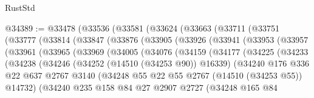 \begin{lexlean}{RustStd}
\begin{coremodule}
@34389 := @33478
    (@33536
      (@33581
        (@33624
          (@33663
            (@33711
              (@33751
                (@33777
                  (@33814
                    (@33847
                      (@33876
                        (@33905
                          (@33926
                            (@33941
                              (@33953
                                (@33957
                                  (@33961
                                    (@33965
                                      (@33969
                                        (@34005
                                          (@34076
                                            (@34159
                                              (@34177
                                                (@34225
                                                  (@34233
                                                    (@34238
                                                      (@34246
                                                        (@34252 (@14510 (@34253 @90)) @16339)
                                                        (@34240
                                                          @176
                                                          @336
                                                          @22
                                                          @637
                                                          @2767
                                                          @3140
                                                          (@34248
                                                            @55
                                                            @22
                                                            @55
                                                            @2767
                                                            (@14510 (@34253 @55))
                                                            @14732)
                                                          (@34240
                                                            @235
                                                            @158
                                                            @84
                                                            @27
                                                            @2907
                                                            @2727
                                                            (@34248
                                                              @165
                                                              @84

\end{coremodule}
\end{lexlean}
